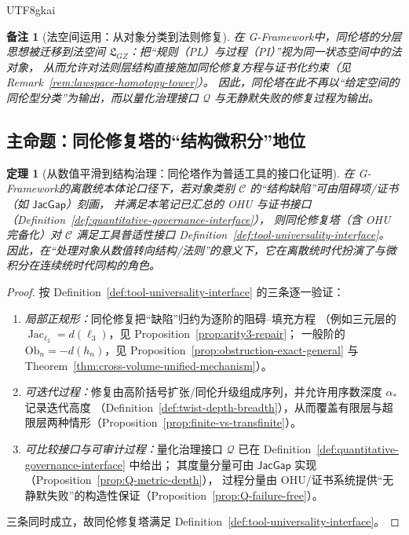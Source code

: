 \documentclass[12pt]{article}
\newtheorem{theorem}{定理}[section]
\newtheorem{remark}{备注}[section]
\newcommand{\GFramework}{\textsf{G-Framework}}
\newcommand{\Layer}{\ensuremath{\ell}}
\newcommand{\Jac}{\operatorname{Jac}}
\newcommand{\Ob}{\mathrm{Ob}}
\newcommand{\JacGap}{\ensuremath{\mathsf{JacGap}}}
\begin{document}
\begin{CJK*}{UTF8}{gkai}
\begin{remark}[法空间运用：从对象分类到法则修复]
在 \GFramework 中，同伦塔的分层思想被迁移到法空间 $\mathfrak{L}_{GZ}$：把“规则（PL）与过程（PI）”视为同一状态空间中的法对象，
从而允许对\emph{法则层结构}直接施加同伦修复方程与证书化约束（见 Remark~\ref{rem:lawspace-homotopy-tower}）。
因此，同伦塔在此不再以“给定空间的同伦型分类”为输出，而以量化治理接口 $\mathcal{Q}$ 与无静默失败的修复过程为输出。%
\cite{HomotopyMinimalityDialogue,GaoZheng2025GFramework}
\end{remark}

\subsection{主命题：同伦修复塔的“结构微积分”地位}

\begin{theorem}[从数值平滑到结构治理：同伦塔作为普适工具的接口化证明]
\label{thm:homotopy-tower-as-new-calculus}
在 \GFramework 的离散统本体论口径下，若对象类别 $\mathcal{C}$ 的“结构缺陷”可由阻碍项/证书（如 $\JacGap$）刻画，
并满足本笔记已汇总的 OHU 与证书接口（Definition~\ref{def:quantitative-governance-interface}），
则同伦修复塔（含 OHU 完备化）对 $\mathcal{C}$ 满足工具普适性接口 Definition~\ref{def:tool-universality-interface}。
因此，在“处理对象从数值转向结构/法则”的意义下，它在离散统时代扮演了与微积分在连续统时代同构的角色。
\end{theorem}

\begin{proof}
按 Definition~\ref{def:tool-universality-interface} 的三条逐一验证：
\begin{enumerate}
  \item \emph{局部正规形：}同伦修复把“缺陷”归约为逐阶的阻碍--填充方程
        （例如三元层的 $\Jac_{\Layer_2}=d(\Layer_3)$，见 Proposition~\ref{prop:arity3-repair}；
        一般阶的 $\Ob_n=-d(h_n)$，见 Proposition~\ref{prop:obstruction-exact-general} 与 Theorem~\ref{thm:cross-volume-unified-mechanism}）。
  \item \emph{可迭代过程：}修复由高阶括号扩张/同伦升级组成序列，并允许用序数深度 $\alpha_\ast$ 记录迭代高度
        （Definition~\ref{def:twist-depth-breadth}），从而覆盖有限层与超限层两种情形（Proposition~\ref{prop:finite-vs-transfinite}）。
  \item \emph{可比较接口与可审计过程：}量化治理接口 $\mathcal{Q}$ 已在 Definition~\ref{def:quantitative-governance-interface} 中给出；
        其度量分量可由 $\JacGap$ 实现（Proposition~\ref{prop:Q-metric-depth}），
        过程分量由 OHU/证书系统提供“无静默失败”的构造性保证（Proposition~\ref{prop:Q-failure-free}）。
\end{enumerate}
三条同时成立，故同伦修复塔满足 Definition~\ref{def:tool-universality-interface}。
\end{proof}


\end{CJK*}
\end{document}
